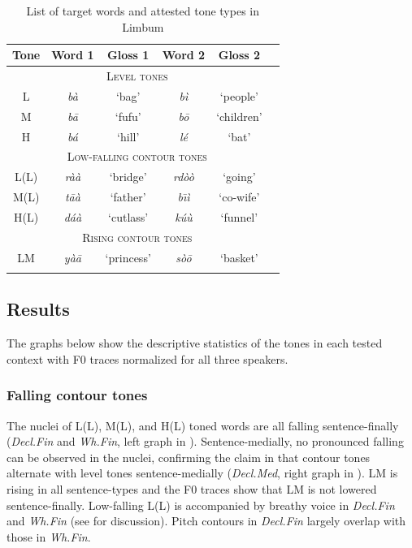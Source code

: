 \documentclass[output=paper,newtxmath,modfonts,nonflat,hidelinks]{langsci/langscibook}
\begin{document}
\begin{table}
\caption{List of target words and attested tone types in Limbum}
\label{tab:gjersoe:targetwords}
\centering
\begin{tabular}{cccccc}
\lsptoprule
\textbf{Tone} & \textbf{Word 1} & \textbf{Gloss 1} & \textbf{Word 2} & \textbf{Gloss 2} \\\midrule
\multicolumn{5}{c}{\textsc{Level tones}} \\\hline
L &  \emph{bà} & `bag' & \emph{b\`i} & `people' \\
M & \emph{b\=a} & `fufu' & \emph{b\=o} & `children'\\
H & \emph{bá} & `hill' & \emph{lé} & `bat' \\
\midrule\multicolumn{5}{c}{\textsc{Low-falling contour tones}} \\\midrule
L(L) & \emph{ràà} & `bridge' & \emph{rd\`o\`o} & `going'\\
M(L) & \emph{t\=aà} & `father' & \emph{b\={\i}\`i} & `co-wife' \\
H(L) & \emph{dáà} & `cutlass' & \emph{k\'u\`u} & `funnel'\\
\midrule\multicolumn{5}{c}{\textsc{Rising contour tones}} \\\midrule
LM & \emph{yà\=a} & `princess' & \emph{s\`o\=o} & `basket'\\ %
\lspbottomrule
\end{tabular}
\end{table}

\subsection{Results}\label{sec:gjersoe:2.2}
The graphs below show the descriptive statistics of the tones in each tested context with F0 traces normalized for all three speakers.

\subsubsection{Falling contour tones}\label{sec:gjersoe:2.2.1}
The nuclei of L(L), M(L), and H(L) toned words are all falling sentence-finally (\textit{Decl.Fin} and \textit{Wh.Fin}, left graph in ).
Sentence-medially, no pronounced falling  can be observed in the nuclei, confirming the claim in \citet{Fransen.1995} that contour tones alternate with level tones sentence-medially (\textit{Decl.Med}, right graph in ).
LM is rising in all sentence-types and the F0 traces show that LM is not lowered sentence-finally.
Low-falling L(L) is accompanied by breathy voice in \textit{Decl.Fin} and \textit{Wh.Fin} (see \citealt{Gjersoe.2016.SP} for discussion).
Pitch contours in \textit{Decl.Fin} largely overlap with those in \textit{Wh.Fin}.
\end{document}
